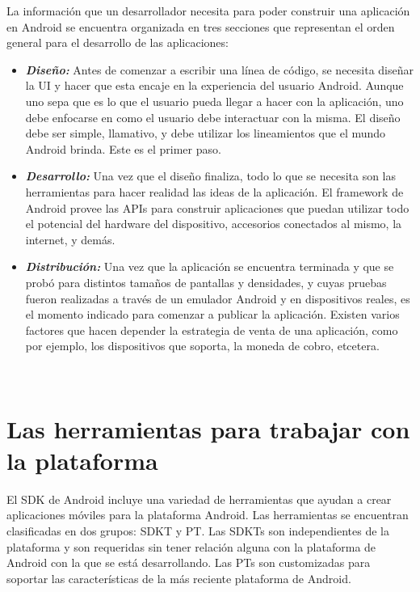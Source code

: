 La informaci\'on que un desarrollador necesita para poder construir una aplicaci\'on en Android se encuentra organizada en tres secciones que representan el orden general para el desarrollo de las aplicaciones:

\begin{itemize}
\item \textbf{\textit{Dise\~no:}} Antes de comenzar a escribir una l\'inea de c\'odigo, se necesita dise\~nar la \ac{UI} y hacer que esta encaje en la experiencia del usuario Android. Aunque uno sepa que es lo que el usuario pueda llegar a hacer con la aplicaci\'on, uno debe enfocarse en como el usuario debe interactuar con la misma. El dise\~no debe ser simple, llamativo, y debe utilizar los lineamientos que el mundo Android brinda. Este es el primer paso.

\item \textbf{\textit{Desarrollo:}} Una vez que el dise\~no finaliza, todo lo que se necesita son las herramientas para hacer realidad las ideas de la aplicaci\'on. El framework de Android provee las \ac{API}s para construir aplicaciones que puedan utilizar todo el potencial del hardware del dispositivo, accesorios conectados al mismo, la internet, y dem\'as. 

\item \textbf{\textit{Distribuci\'on:}} Una vez que la aplicaci\'on se encuentra terminada y que se prob\'o para distintos tama\~nos de pantallas y densidades, y cuyas pruebas fueron realizadas a trav\'es de un emulador Android y en dispositivos reales, es el momento indicado para comenzar a publicar la aplicaci\'on. Existen varios factores que hacen depender la estrategia de venta de una aplicaci\'on, como por ejemplo, los dispositivos que soporta, la moneda de cobro, etcetera.
\end{itemize}~\cite{and.dev.sdk}

\section{Las herramientas para trabajar con la plataforma}
\label{sec:android.tools.1}

El \ac{SDK} de Android incluye una variedad de herramientas que ayudan a crear aplicaciones m\'oviles para la plataforma Android. Las herramientas se encuentran clasificadas en dos grupos: \ac{SDKT} y \ac{PT}. Las \ac{SDKT}s  son independientes de la plataforma y son requeridas sin tener relaci\'on alguna con la plataforma de Android con la que se est\'a desarrollando. Las \ac{PT}s son customizadas para soportar las caracter\'isticas de la m\'as reciente plataforma de Android.

